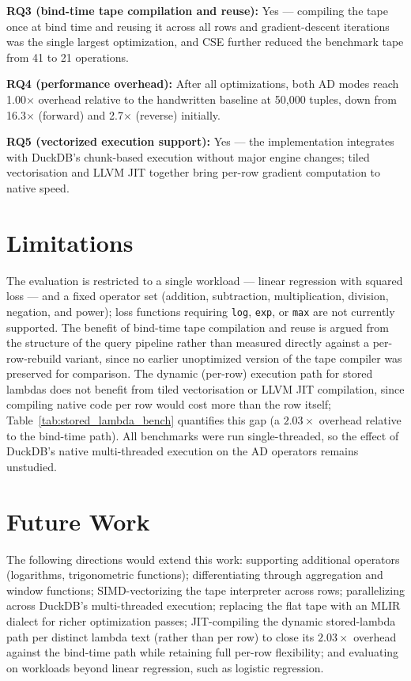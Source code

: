 \documentclass[12pt]{report}
\begin{document}
\textbf{RQ3 (bind-time tape compilation and reuse):} Yes — compiling the tape
once at bind time and reusing it across all rows and gradient-descent
iterations was the single largest optimization, and CSE further reduced the
benchmark tape from 41 to 21 operations.

\textbf{RQ4 (performance overhead):} After all optimizations, both AD modes
reach 1.00$\times$ overhead relative to the handwritten baseline at 50{,}000
tuples, down from 16.3$\times$ (forward) and 2.7$\times$ (reverse) initially.

\textbf{RQ5 (vectorized execution support):} Yes — the implementation
integrates with DuckDB's chunk-based execution without major engine changes;
tiled vectorisation and LLVM JIT together bring per-row gradient computation
to native speed.

\section{Limitations}

The evaluation is restricted to a single workload --- linear regression
with squared loss --- and a fixed operator set (addition, subtraction,
multiplication, division, negation, and power); loss functions requiring
\texttt{log}, \texttt{exp}, or \texttt{max} are not currently supported.
The benefit of bind-time tape compilation and reuse is argued from the
structure of the query pipeline rather than measured directly against a
per-row-rebuild variant, since no earlier unoptimized version of the tape
compiler was preserved for comparison. The dynamic (per-row) execution
path for stored lambdas does not benefit from tiled vectorisation or LLVM
JIT compilation, since compiling native code per row would cost more than
the row itself; Table~\ref{tab:stored_lambda_bench} quantifies this gap
(a $2.03\times$ overhead relative to the bind-time path). All benchmarks were run
single-threaded, so the effect of DuckDB's native multi-threaded execution
on the AD operators remains unstudied.

\section{Future Work}
The following directions would extend this work: supporting additional
operators (logarithms, trigonometric functions); differentiating through
aggregation and window functions; SIMD-vectorizing the tape interpreter
across rows; parallelizing across DuckDB's multi-threaded execution;
replacing the flat tape with an MLIR dialect for richer optimization passes;
JIT-compiling the dynamic stored-lambda path per distinct lambda text
(rather than per row) to close its $2.03\times$ overhead against the
bind-time path while retaining full per-row flexibility; and evaluating on
workloads beyond linear regression, such as logistic regression.
\end{document}
